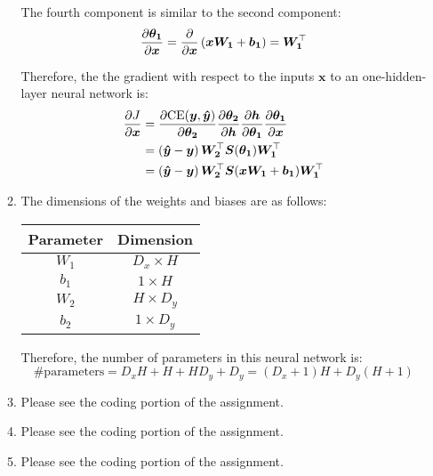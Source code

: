 \documentclass[11pt,reqno]{amsart}
\begin{document}
\begin{enumerate}[topsep=0pt,itemsep=2ex,partopsep=1ex,parsep=1ex]
\begin{enumerate}
    The fourth component is similar to the second component:
    \begin{equation*}
      \frac{\partial \bm{\theta_1}}{\partial \bm{x}} = \frac{\partial}{\partial \bm{x}} \left( \bm{x W_1} + \bm{b_1} \right) = \bm{W_1}^\top
    \end{equation*}

    Therefore, the the gradient with respect to the inputs $\bm{x}$ to an one-hidden-layer neural network is:
    \begin{align*}
      \frac{\partial J}{\partial \bm{x}}
      &= \frac{\partial \text{CE}(\bm{y}, \bm{\hat{y}})}{\partial \bm{\theta_2}} \frac{\partial \bm{\theta_2}}{\partial \bm{h}} \frac{\partial \bm{h}}{\partial \bm{\theta_1}} \frac{\partial \bm{\theta_1}}{\partial \bm{x}} \\
      &= \left( \bm{\hat{y}} - \bm{y} \right) \bm{W_2}^\top \bm{S}(\bm{\theta_1}) \bm{W_1}^\top \\
      &= \left( \bm{\hat{y}} - \bm{y} \right) \bm{W_2}^\top \bm{S}(\bm{x W_1} + \bm{b_1}) \bm{W_1}^\top
    \end{align*}

  \item
    The dimensions of the weights and biases are as follows:
    \vspace{1mm}
    \begin{center}
      \begin{tabular}{|c|c|}
        \hline
        Parameter & Dimension \\
        \hline
        $W_1$ & $D_x \times H$ \\
        $b_1$ & $1 \times H$ \\
        $W_2$ & $H \times D_y$ \\
        $b_2$ & $1 \times D_y$ \\
        \hline
      \end{tabular}
    \end{center}
    \vspace{1mm}
    Therefore, the number of parameters in this neural network is:
    \begin{equation*}
      \text{\# parameters} = D_x H + H + H D_y + D_y = (D_x + 1) H + D_y (H + 1)
    \end{equation*}

  \item Please see the coding portion of the assignment.
  \item Please see the coding portion of the assignment.
  \item Please see the coding portion of the assignment.
  \end{enumerate}



\end{enumerate}
\end{document}
